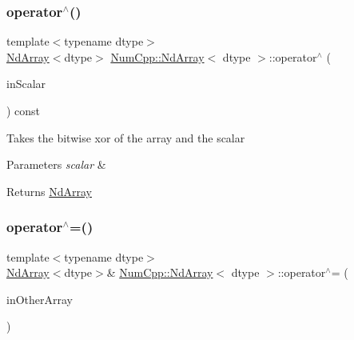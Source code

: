 \subsubsection{\texorpdfstring{operator$^\wedge$()}{operator^()}\hspace{0.1cm}{\footnotesize\ttfamily [2/2]}}
{\footnotesize\ttfamily template$<$typename dtype$>$ \\
\mbox{\hyperlink{class_num_cpp_1_1_nd_array}{Nd\+Array}}$<$dtype$>$ \mbox{\hyperlink{class_num_cpp_1_1_nd_array}{Num\+Cpp\+::\+Nd\+Array}}$<$ dtype $>$\+::operator$^\wedge$ (\begin{DoxyParamCaption}\item[{dtype}]{in\+Scalar }\end{DoxyParamCaption}) const\hspace{0.3cm}{\ttfamily [inline]}}

Takes the bitwise xor of the array and the scalar


\begin{DoxyParams}{Parameters}
{\em scalar} & \\
\hline
\end{DoxyParams}
\begin{DoxyReturn}{Returns}
\mbox{\hyperlink{class_num_cpp_1_1_nd_array}{Nd\+Array}} 
\end{DoxyReturn}
\mbox{\label{class_num_cpp_1_1_nd_array_ad9fe6ed22c3afc02250f275e098155bd}} 
\subsubsection{\texorpdfstring{operator$^\wedge$=()}{operator^=()}\hspace{0.1cm}{\footnotesize\ttfamily [1/2]}}
{\footnotesize\ttfamily template$<$typename dtype$>$ \\
\mbox{\hyperlink{class_num_cpp_1_1_nd_array}{Nd\+Array}}$<$dtype$>$\& \mbox{\hyperlink{class_num_cpp_1_1_nd_array}{Num\+Cpp\+::\+Nd\+Array}}$<$ dtype $>$\+::operator$^\wedge$= (\begin{DoxyParamCaption}\item[{const \mbox{\hyperlink{class_num_cpp_1_1_nd_array}{Nd\+Array}}$<$ dtype $>$ \&}]{in\+Other\+Array }\end{DoxyParamCaption})\hspace{0.3cm}{\ttfamily [inline]}}

